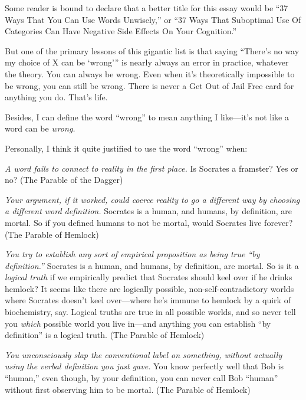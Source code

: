 \myendsectiontext


{
 Some reader is bound to declare that a better title for this essay
would be ``37 Ways That You Can Use Words
Unwisely,'' or ``37 Ways That
Suboptimal Use Of Categories Can Have Negative Side Effects On Your
Cognition.'' }

{
 But one of the primary lessons of this gigantic list is that
saying ``There's no way my choice of X
can be `wrong''' is
nearly always an error in practice, whatever the theory. You can always
be wrong. Even when it's theoretically impossible to be
wrong, you can still be wrong. There is never a Get Out of Jail Free
card for anything you do. That's life.}

{
 Besides, I can define the word
``wrong'' to mean anything I
like---it's not like a word can be \textit{wrong.}}

{
 Personally, I think it quite justified to use the word
``wrong'' when:}

{
 \textit{A word fails to connect to reality in the first place.} Is
Socrates a framster? Yes or no? (The Parable of the Dagger)}

{
 \textit{Your argument, if it worked, could coerce reality to go a
different way by choosing a different word definition.} Socrates is a
human, and humans, by definition, are mortal. So if you defined humans
to not be mortal, would Socrates live forever? (The Parable of
Hemlock)}

{
 \textit{You try to establish any sort of empirical proposition as
being true ``by definition.''}
Socrates is a human, and humans, by definition, are mortal. So is it a
\textit{logical truth} if we empirically predict that Socrates should
keel over if he drinks hemlock? It seems like there are logically
possible, non-self-contradictory worlds where Socrates
doesn't keel over---where he's immune
to hemlock by a quirk of biochemistry, say. Logical truths are true in
all possible worlds, and so never tell you \textit{which} possible
world you live in---and anything you can establish
``by definition'' is a logical
truth. (The Parable of Hemlock)}

{
 \textit{You unconsciously slap the conventional label on
something, without actually using the verbal definition you just gave.}
You know perfectly well that Bob is
``human,'' even though, by your
definition, you can never call Bob
``human'' without first observing
him to be mortal. (The Parable of Hemlock)}

